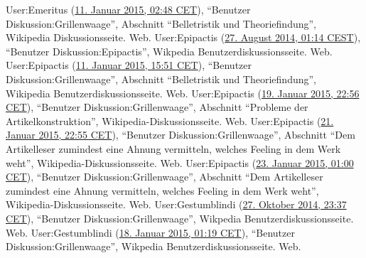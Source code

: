 \documentclass[fontsize=12pt]{scrartcl}
\begin{document}
{{{{\begin{thebibliography}
	User:Emeritus (\href{https://de.wikipedia.org/w/index.php?title=Benutzer_Diskussion:Grillenwaage\&diff=137653987\&oldid=137652648}{11. Januar 2015, 02:48 CET}), "`Be\-nut\-zer Dis\-kus\-si\-on:Grillenwaage"', Abschnitt "`Belletristik und Theoriefindung"', Wi\-ki\-pe\-dia Dis\-kus\-si\-onsseite. Web.
	User:Epipactis (\href{https://de.wikipedia.org/w/index.php?title=Benutzer_Diskussion:Epipactis\&diff=133460313\&oldid=133455572}{27. August 2014, 01:14 CEST}), "`Be\-nut\-zer Dis\-kus\-si\-on:Epipactis"', Wikpedia Benutzerdis\-kus\-si\-onsseite. Web.
	User:Epipactis (\href{https://de.wikipedia.org/w/index.php?title=Benutzer_Diskussion:Grillenwaage\&diff=next\&oldid=137663350}{11. Januar 2015, 15:51 CET}), "`Be\-nut\-zer Dis\-kus\-si\-on:Grillenwaage"', Abschnitt "`Belletristik und Theoriefindung"', Wi\-ki\-pe\-dia Be\-nut\-zerdis\-kus\-si\-onsseite. Web.
	User:Epipactis (\href{https://de.wikipedia.org/w/index.php?title=Benutzer_Diskussion:Grillenwaage\&diff=137961506\&oldid=137943802}{19. Januar 2015, 22:56 CET}), "`Be\-nut\-zer Dis\-kus\-si\-on:Grillenwaage"', Abschnitt "`Pro\-ble\-me der Artikelkonstruktion"', Wi\-ki\-pe\-dia-Dis\-kus\-si\-onsseite. Web.
	User:Epipactis (\href{https://de.wikipedia.org/w/index.php?title=Benutzer_Diskussion:Grillenwaage\&diff=next\&oldid=138032479}{21. Januar 2015, 22:55 CET}), "`Be\-nut\-zer Dis\-kus\-si\-on:Grillenwaage"', Abschnitt "`Dem Artikelleser zumindest eine Ahnung vermitteln, welches \flq Feeling\frq \,\,in dem Werk weht"', Wi\-ki\-pe\-dia-Dis\-kus\-si\-onsseite. Web.
	User:Epipactis (\href{https://de.wikipedia.org/w/index.php?title=Benutzer_Diskussion:Grillenwaage\&diff=next&oldid=138067900}{23. Januar 2015, 01:00 CET}), "`Be\-nut\-zer Dis\-kus\-si\-on:Grillenwaage"', Abschnitt "`Dem Artikelleser zumindest eine Ahnung vermitteln, welches \flq Feeling\frq \,\,in dem Werk weht"', Wi\-ki\-pe\-dia-Dis\-kus\-si\-onsseite. Web.
	User:Ges\-tum\-blin\-di (\href{https://de.wikipedia.org/w/index.php?title=Benutzer_Diskussion:Grillenwaage\&diff=next\&oldid=135281196}{27. Oktober 2014, 23:37 CET}), "`Be\-nut\-zer Dis\-kus\-si\-on:Gril\-len\-waage"', Wikpedia Be\-nut\-zer\-dis\-kus\-si\-ons\-sei\-te. Web.
	User:Ges\-tum\-blin\-di (\href{https://de.wikipedia.org/w/index.php?title=Benutzer_Diskussion:Grillenwaage\&diff=next\&oldid=137891471}{18. Januar 2015, 01:19 CET}), "`Be\-nut\-zer Dis\-kus\-si\-on:Gril\-len\-waage"', Wikpedia Be\-nut\-zer\-dis\-kus\-si\-ons\-sei\-te. Web.

\end{thebibliography}}}}}
\end{document}
